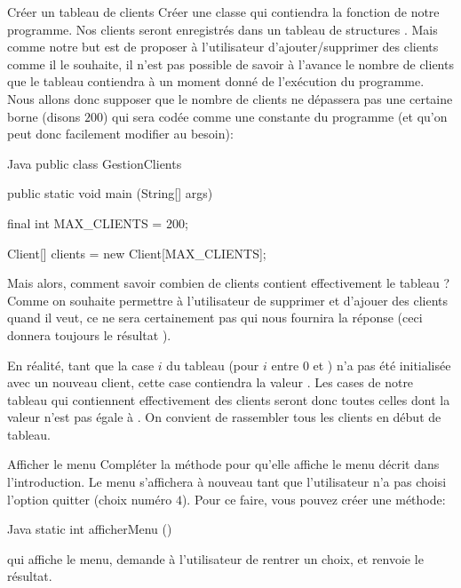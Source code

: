 \documentclass[a4paper,11pt]{article}
\begin{document}
	\newpage

 
 	\begin{Exercice}{Cr\'eer un tableau de clients}
	Cr\'eer une classe  qui contiendra la fonction  de notre programme. Nos clients seront enregistr\'es dans un tableau de structures . Mais comme notre but est de proposer \`a l'utilisateur d'ajouter/supprimer des clients comme il le souhaite, il n'est pas possible de savoir \`a l'avance le nombre de clients que le tableau contiendra \`a un moment donn\'e de l'ex\'ecution du programme. Nous allons donc supposer que le nombre de clients ne dépassera pas une certaine borne (disons $200$) qui sera cod\'ee comme une constante du programme (et qu'on peut donc facilement modifier au besoin):
	
		\begin{Code}{Java} 
			public class GestionClients
			{	
				public static void main (String[] args)
				{
				        final int MAX_CLIENTS = 200;
				        				
				        Client[] clients = new Client[MAX_CLIENTS];
				}
			}
		\end{Code}
Mais alors, comment savoir combien de clients contient effectivement le tableau ? Comme on souhaite permettre \`a l'utilisateur de supprimer et d'ajouer des clients quand il veut, ce ne sera certainement pas  qui nous fournira la réponse (ceci donnera toujours le r\'esultat ).

En réalité, tant que la case $i$ du tableau (pour $i$ entre $0$ et ) n'a pas été initialisée avec un nouveau client, cette case contiendra la valeur . Les cases de notre tableau qui contiennent effectivement des clients seront donc toutes celles dont la valeur n'est pas égale à . On convient de rassembler tous les clients en d\'ebut de tableau.
\end{Exercice}	

 \begin{Exercice}{Afficher le menu}
 	    Compl\'eter la m\'ethode  pour qu'elle affiche le menu d\'ecrit dans l'introduction. Le menu s'affichera \`a nouveau tant que l'utilisateur n'a pas choisi l'option quitter (choix num\'ero $4$). Pour ce faire, vous pouvez cr\'eer une m\'ethode:
	    
     \begin{Code}{Java}
		   static int afficherMenu ()
     \end{Code}	    		
qui affiche le menu, demande \`a l'utilisateur de rentrer un choix, et renvoie le r\'esultat.
		
  \end{Exercice}
  
\end{document}
